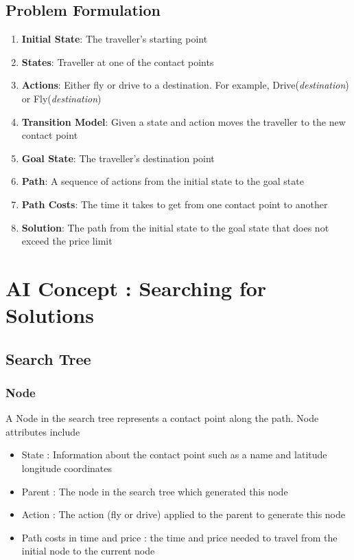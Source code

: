 \documentclass[11pt]{article}
\begin{document}
\subsection{Problem Formulation}
\begin{enumerate}
\item \textbf{Initial State}: The traveller's starting point
\item \textbf{States}: Traveller at one of the contact points
\item	 \textbf{Actions}: Either fly or drive to a destination. For example, Drive(\emph{destination}) or Fly(\emph{destination})
\item \textbf{Transition Model}: Given a state and action moves the traveller to the new contact point
\item \textbf{Goal State}: The traveller's destination point
\item \textbf{Path}: A sequence of actions from the initial state to the goal state
\item \textbf{Path Costs}: The time it takes to get from one contact point to another %
\item \textbf{Solution}: The path from the initial state to the goal state that does not exceed the price limit
\end{enumerate}


\section{AI Concept : Searching for Solutions}

\subsection{Search Tree}

\subsubsection{Node} A Node in the search tree represents a contact point along the path. Node attributes include
\begin{itemize}
\item State : Information about the contact point such as a name and latitude longitude coordinates
\item Parent : The node in the search tree which generated this node
\item Action : The action (fly or drive) applied to the parent to generate this node
\item Path costs in time and price : the time and price needed to travel from the initial node to the current node
\end{itemize}
\end{document}
